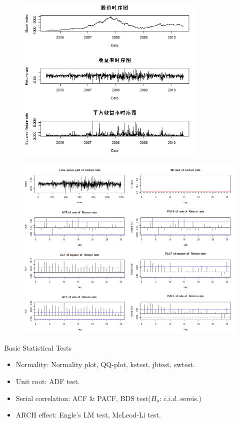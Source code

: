 \documentclass{beamer}
\begin{document}
\begin{frame}
  \begin{figure}[htp]
    \centering
    \hypertarget{volatility clustered}{\includegraphics[height = 8cm]{fig/SSEC_05_10.jpg}}
      \label{fig:Tirplot} 
  \end{figure}
\end{frame}


\begin{frame}
  \begin{figure}[htp]
    \centering
      \hypertarget{series corr}{\includegraphics[width = .9\columnwidth]{fig/Acf_pacf_plot.png}}
  \end{figure}
\end{frame}


\begin{frame}{Basic Statistical Tests}
  \begin{itemize}
    \item Normality: Normality plot, QQ-plot, kstest, jbtest, swtest.
    \item Unit root: ADF test.
    \item Serial correlation: ACF \& PACF, BDS test($H_o$: $i.i.d.$ sereis.)
    \item ARCH effect: Engle's LM test, McLeod-Li test.
  \end{itemize}
\end{frame}
\end{document}
